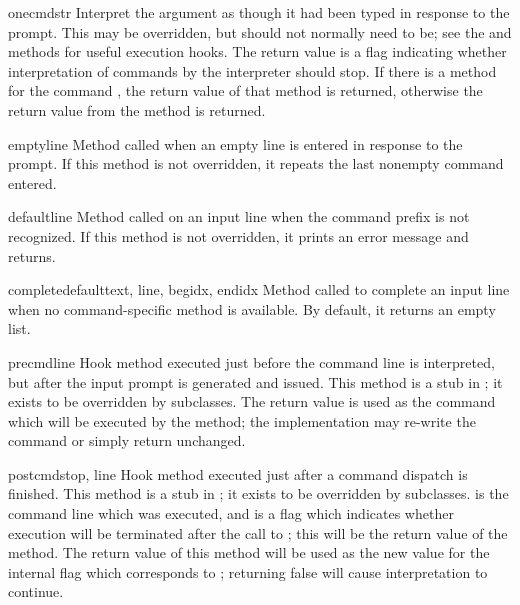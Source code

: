 \begin{methoddesc}{onecmd}{str}
Interpret the argument as though it had been typed in response to the
prompt.  This may be overridden, but should not normally need to be;
see the  and  methods for useful
execution hooks.  The return value is a flag indicating whether
interpretation of commands by the interpreter should stop.  If there
is a  method for the command , the return
value of that method is returned, otherwise the return value from the
 method is returned.
\end{methoddesc}

\begin{methoddesc}{emptyline}{}
Method called when an empty line is entered in response to the prompt.
If this method is not overridden, it repeats the last nonempty command
entered.  
\end{methoddesc}

\begin{methoddesc}{default}{line}
Method called on an input line when the command prefix is not
recognized. If this method is not overridden, it prints an
error message and returns.
\end{methoddesc}

\begin{methoddesc}{completedefault}{text, line, begidx, endidx}
Method called to complete an input line when no command-specific
 method is available.  By default, it returns an
empty list.
\end{methoddesc}

\begin{methoddesc}{precmd}{line}
Hook method executed just before the command line  is
interpreted, but after the input prompt is generated and issued.  This
method is a stub in ; it exists to be overridden by
subclasses.  The return value is used as the command which will be
executed by the  method; the 
implementation may re-write the command or simply return 
unchanged.
\end{methoddesc}

\begin{methoddesc}{postcmd}{stop, line}
Hook method executed just after a command dispatch is finished.  This
method is a stub in ; it exists to be overridden by
subclasses.   is the command line which was executed, and
 is a flag which indicates whether execution will be
terminated after the call to ; this will be the
return value of the  method.  The return value of
this method will be used as the new value for the internal flag which
corresponds to ; returning false will cause interpretation
to continue.
\end{methoddesc}

